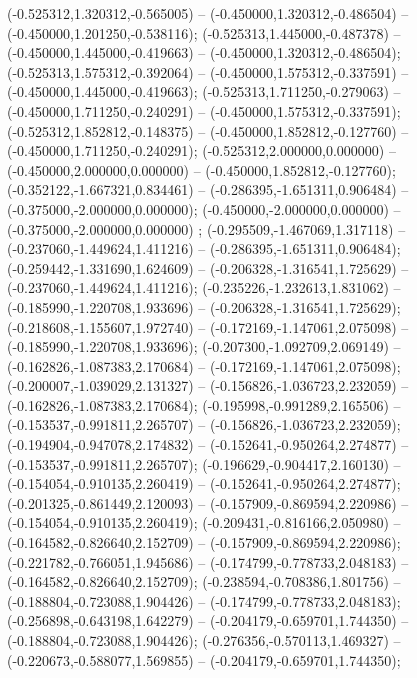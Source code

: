  (-0.525312,1.320312,-0.565005) -- (-0.450000,1.320312,-0.486504) -- (-0.450000,1.201250,-0.538116);
 (-0.525313,1.445000,-0.487378) -- (-0.450000,1.445000,-0.419663) -- (-0.450000,1.320312,-0.486504);
 (-0.525313,1.575312,-0.392064) -- (-0.450000,1.575312,-0.337591) -- (-0.450000,1.445000,-0.419663);
 (-0.525313,1.711250,-0.279063) -- (-0.450000,1.711250,-0.240291) -- (-0.450000,1.575312,-0.337591);
 (-0.525312,1.852812,-0.148375) -- (-0.450000,1.852812,-0.127760) -- (-0.450000,1.711250,-0.240291);
 (-0.525312,2.000000,0.000000) -- (-0.450000,2.000000,0.000000) -- (-0.450000,1.852812,-0.127760);
 (-0.352122,-1.667321,0.834461) -- (-0.286395,-1.651311,0.906484) -- (-0.375000,-2.000000,0.000000);
 (-0.450000,-2.000000,0.000000) -- (-0.375000,-2.000000,0.000000) ;
 (-0.295509,-1.467069,1.317118) -- (-0.237060,-1.449624,1.411216) -- (-0.286395,-1.651311,0.906484);
 (-0.259442,-1.331690,1.624609) -- (-0.206328,-1.316541,1.725629) -- (-0.237060,-1.449624,1.411216);
 (-0.235226,-1.232613,1.831062) -- (-0.185990,-1.220708,1.933696) -- (-0.206328,-1.316541,1.725629);
 (-0.218608,-1.155607,1.972740) -- (-0.172169,-1.147061,2.075098) -- (-0.185990,-1.220708,1.933696);
 (-0.207300,-1.092709,2.069149) -- (-0.162826,-1.087383,2.170684) -- (-0.172169,-1.147061,2.075098);
 (-0.200007,-1.039029,2.131327) -- (-0.156826,-1.036723,2.232059) -- (-0.162826,-1.087383,2.170684);
 (-0.195998,-0.991289,2.165506) -- (-0.153537,-0.991811,2.265707) -- (-0.156826,-1.036723,2.232059);
 (-0.194904,-0.947078,2.174832) -- (-0.152641,-0.950264,2.274877) -- (-0.153537,-0.991811,2.265707);
 (-0.196629,-0.904417,2.160130) -- (-0.154054,-0.910135,2.260419) -- (-0.152641,-0.950264,2.274877);
 (-0.201325,-0.861449,2.120093) -- (-0.157909,-0.869594,2.220986) -- (-0.154054,-0.910135,2.260419);
 (-0.209431,-0.816166,2.050980) -- (-0.164582,-0.826640,2.152709) -- (-0.157909,-0.869594,2.220986);
 (-0.221782,-0.766051,1.945686) -- (-0.174799,-0.778733,2.048183) -- (-0.164582,-0.826640,2.152709);
 (-0.238594,-0.708386,1.801756) -- (-0.188804,-0.723088,1.904426) -- (-0.174799,-0.778733,2.048183);
 (-0.256898,-0.643198,1.642279) -- (-0.204179,-0.659701,1.744350) -- (-0.188804,-0.723088,1.904426);
 (-0.276356,-0.570113,1.469327) -- (-0.220673,-0.588077,1.569855) -- (-0.204179,-0.659701,1.744350);
